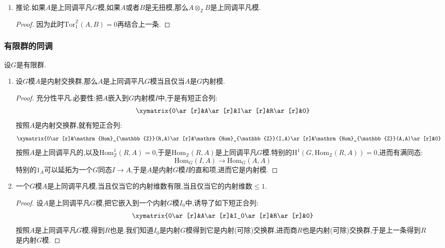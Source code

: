 \begin{enumerate}
\begin{proof}
		按照上一条可取$A$的投射预解$0\to P_1\to P_0\to A\to0$,于是有长正合列:
		$$\xymatrix{0\ar[r]&\mathrm{Tor}^{\mathbb{Z}}_1(A,B)\ar[r]&P_1\otimes_{\mathbb{Z}}B\ar[r]&P_0\otimes_{\mathbb{Z}}B\ar[r]&A\otimes_{\mathbb{Z}}B\ar[r]&0}$$
		由于$P_0,P_1$是投射$G$模,所以这里$P_1\otimes B$和$P_0\otimes B$是上同调平凡模,进而按照上面正合列就有$\mathrm{Tor}(A,B)$是上同调平凡模当且仅当$A\otimes B$是上同调平凡模.$\mathrm{Hom}$的情况是类似的.
	\end{proof}
	\item 推论.如果$A$是上同调平凡$G$模,如果$A$或者$B$是无扭模,那么$A\otimes_{\mathbb{Z}}B$是上同调平凡模.
	\begin{proof}
		
		因为此时$\mathrm{Tor}^{\mathbb{Z}}_1(A,B)=0$再结合上一条.
	\end{proof}
\end{enumerate}
\subsubsection{有限群的同调}

设$G$是有限群.
\begin{enumerate}
	\item 设$G$模$A$是内射交换群,那么$A$是上同调平凡$G$模当且仅当$A$是$G$内射模.
	\begin{proof}
		
		充分性平凡.必要性:把$A$嵌入到$G$内射模$I$中,于是有短正合列:
		$$\xymatrix{0\ar[r]&A\ar[r]&I\ar[r]&R\ar[r]&0}$$
		按照$A$是内射交换群,就有短正合列:
		$$\xymatrix{0\ar[r]&\mathrm{Hom}_{\mathbb{Z}}(R,A)\ar[r]&\mathrm{Hom}_{\mathbb{Z}}(I,A)\ar[r]&\mathrm{Hom}_{\mathbb{Z}}(A,A)\ar[r]&0}$$
		按照$A$是上同调平凡的,以及$\mathrm{Hom}_{\mathbb{Z}}^1(R,A)=0$,于是$\mathrm{Hom}_{\mathbb{Z}}(R,A)$是上同调平凡$G$模.特别的$\mathrm{H}^1(G,\mathrm{Hom}_{\mathbb{Z}}(R,A))=0$,进而有满同态:
		$$\mathrm{Hom}_G(I,A)\to\mathrm{Hom}_G(A,A)$$
		特别的$1_A$可以延拓为一个$G$同态$I\to A$,于是$A$是内射$G$模$I$的直和项,进而它是内射模.
	\end{proof}
	\item 一个$G$模$A$是上同调平凡模,当且仅当它的内射维数有限,当且仅当它的内射维数$\le1$.
	\begin{proof}
		
		设$A$是上同调平凡$G$模,把它嵌入到一个内射$G$模$I_0$中,诱导了如下短正合列:
		$$\xymatrix{0\ar[r]&A\ar[r]&I_0\ar[r]&R\ar[r]&0}$$
		按照$A$是上同调平凡$G$模,得到$R$也是.我们知道$I_0$是内射$G$模得到它是内射(可除)交换群,进而商$R$也是内射(可除)交换群,于是上一条得到$R$是内射$G$模.
	\end{proof}
\end{enumerate}
